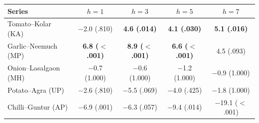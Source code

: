\begin{tabular}{lcccc}
\toprule
Series & $h{=}1$ & $h{=}3$ & $h{=}5$ & $h{=}7$\\
\midrule
Tomato--Kolar (KA) & $-$2.0 (.810) & \textbf{4.6 (.014)} & \textbf{4.1 (.030)} & \textbf{5.1 (.016)}\\
Garlic--Neemuch (MP) & \textbf{6.8 ($<$.001)} & \textbf{8.9 ($<$.001)} & \textbf{6.6 ($<$.001)} & 4.5 (.093)\\
Onion--Lasalgaon (MH) & $-$0.7 (1.000) & $-$0.6 (1.000) & $-$1.2 (1.000) & $-$0.9 (1.000)\\
Potato--Agra (UP) & $-$2.6 (.810) & $-$5.5 (.069) & $-$4.0 (.425) & $-$1.8 (1.000)\\
Chilli--Guntur (AP) & $-$6.9 (.001) & $-$6.3 (.057) & $-$9.4 (.014) & $-$19.1 ($<$.001)\\
\bottomrule
\end{tabular}
